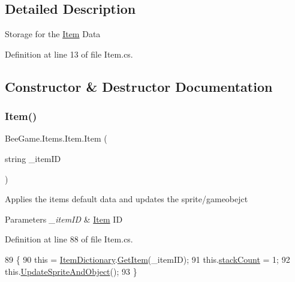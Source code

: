 \subsection{Detailed Description}
Storage for the \hyperlink{struct_bee_game_1_1_items_1_1_item}{Item} Data 



Definition at line 13 of file Item.\+cs.



\subsection{Constructor \& Destructor Documentation}
\mbox{\label{struct_bee_game_1_1_items_1_1_item_a38da9d1a85c2c67bc86f2d655386dbb2}} 
\subsubsection{\texorpdfstring{Item()}{Item()}\hspace{0.1cm}{\footnotesize\ttfamily [1/2]}}
{\footnotesize\ttfamily Bee\+Game.\+Items.\+Item.\+Item (\begin{DoxyParamCaption}\item[{string}]{\+\_\+item\+ID }\end{DoxyParamCaption})}



Applies the item\textquotesingle{}s default data and updates the sprite/gameobejct 


\begin{DoxyParams}{Parameters}
{\em \+\_\+item\+ID} & \hyperlink{struct_bee_game_1_1_items_1_1_item}{Item} ID\\
\hline
\end{DoxyParams}


Definition at line 88 of file Item.\+cs.


\begin{DoxyCode}
89         \{
90             \textcolor{keyword}{this} = \hyperlink{class_bee_game_1_1_core_1_1_item_dictionary}{ItemDictionary}.\hyperlink{class_bee_game_1_1_core_1_1_item_dictionary_a936e5313065bf33e4ed0cd766fa0fedb}{GetItem}(\_itemID);
91             this.\hyperlink{struct_bee_game_1_1_items_1_1_item_aaa169917b0e0f8472f20398d5d448388}{stackCount} = 1;
92             this.\hyperlink{struct_bee_game_1_1_items_1_1_item_a29abdb5010a23262e7562720bb85c171}{UpdateSpriteAndObject}();
93         \}
\end{DoxyCode}
\mbox{\label{struct_bee_game_1_1_items_1_1_item_a6835b101e630bc6350059de3b058bae9}} 
